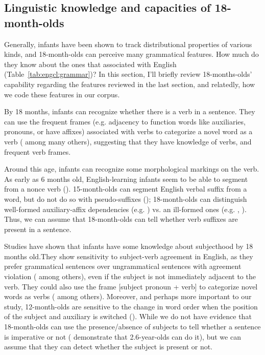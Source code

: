 \subsection{Linguistic knowledge and capacities of 18-month-olds}
\label{sec:engcl:bg:assumptions}

Generally, infants have been shown to track distributional properties of various kinds, and 18-month-olds can perceive many grammatical features. How much do they know about the ones that associated with English \diis{} (Table~\ref{tab:engcl:grammar})? In this section, I'll briefly review 18-months-olds' capability regarding the features reviewed in the last section, and relatedly, how we code these features in our corpus. %

 By 18 months, infants can recognize whether there is a verb in a sentence. They can use the frequent frames (e.g. adjacency to function words like auxiliaries, pronouns, or have affixes) associated with verbs to categorize a novel word as a verb (\cite{echols2004verb, mintz2006verb,peterson2006aux,soderstrom2007sv, lidzoritaomaki2012, shi2014functional, helidz2017verb} among many others), suggesting that they have knowledge of verbs, and frequent verb frames. 

 Around this age, infants can recognize some morphological markings on the verb.  As early as 6 months old, English-learning infants seem to be able to segment  from a nonce verb (\cite{kimmegha2016morph}). 15-month-olds can segment English verbal suffix  from a word, but do not do so with pseudo-suffixes (\cite{mintz2013segmentation}); 18-month-olds can distinguish well-formed auxiliary-affix dependencies (e.g. ) vs. an ill-formed ones (e.g. , \cite{santelmann1998morph}). Thus, we can assume that 18-month-olds can tell whether verb suffixes are present in a sentence.

 Studies have shown that infants have some knowledge about subjecthood by 18 months old.They show sensitivity to subject-verb agreement in English, as they prefer grammatical sentences over ungrammatical sentences with agreement violation (\cite{soderstrom2002agr, soderstrom2007sv, nazzi2011} among others), even if the subject is not immediately adjacent to the verb. They could also use the frame [subject pronoun + verb] to categorize novel words as verbs (\cite{babineau202014func,peterson2006aux, mintz2006verb,shi2014functional} among others). Moreover, and perhaps more important to our study, 12-month-olds are sensitive to the change in word order when the position of the subject and auxiliary is switched (\cite{geffenmintz2015wordorder}). While we do not have evidence that 18-month-olds can use the presence/absence of subjects to tell whether a sentence is imperative or not (\cite{orfitellihyams2012subj} demonstrate that 2.6-year-olds can do it), but we can assume that they can detect whether the subject is present or not.



